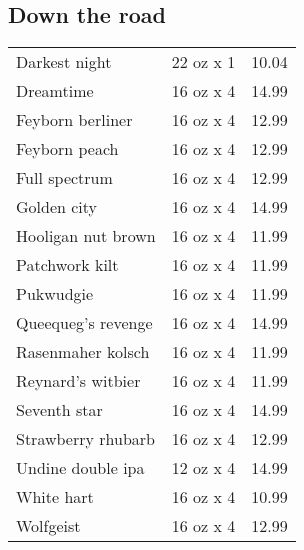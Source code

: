 \documentclass{article}%
\begin{document}
\begin{multicols}{3}
\subsection*{Down the road}%
\begin{tabular}{>{\raggedright}p{16ex\hangindent=3ex} c r}%
Darkest night&22 oz x 1&10.04\\%
Dreamtime&16 oz x 4&14.99\\%
Feyborn berliner&16 oz x 4&12.99\\%
Feyborn peach&16 oz x 4&12.99\\%
Full spectrum&16 oz x 4&12.99\\%
Golden city&16 oz x 4&14.99\\%
Hooligan nut brown&16 oz x 4&11.99\\%
Patchwork kilt&16 oz x 4&11.99\\%
Pukwudgie&16 oz x 4&11.99\\%
Queequeg's revenge&16 oz x 4&14.99\\%
Rasenmaher kolsch&16 oz x 4&11.99\\%
Reynard's witbier&16 oz x 4&11.99\\%
Seventh star&16 oz x 4&14.99\\%
Strawberry rhubarb&16 oz x 4&12.99\\%
Undine double ipa&12 oz x 4&14.99\\%
White hart&16 oz x 4&10.99\\%
Wolfgeist&16 oz x 4&12.99\\%
\end{tabular}

%

\end{multicols}
\end{document}
